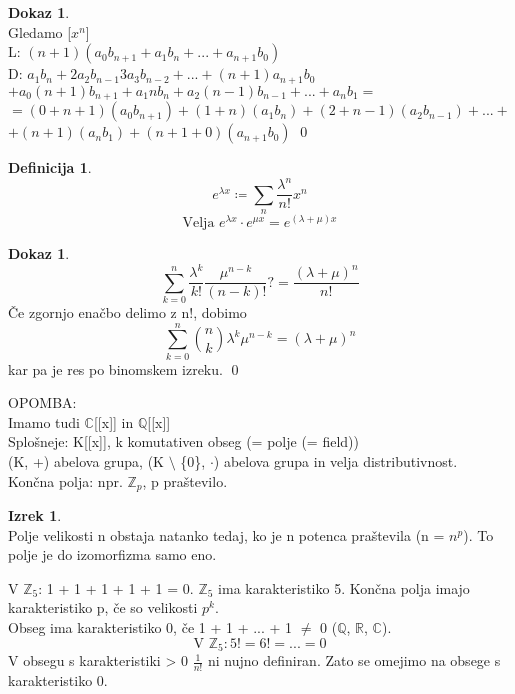 \documentclass[a4paper,12pt]{article}
\theoremstyle{definition}
\newtheorem{defn}[counter]{Definicija}
\newtheorem{theorem}[counter]{Izrek}
\newtheorem{pro}[counter]{Dokaz}
\theoremstyle{remark}
\newcommand{\Z}{\mathbb{Z}}
\newcommand{\Q}{\mathbb{Q}}
\newcommand{\R}{\mathbb{R}}
\newcommand{\C}{\mathbb{C}}
\begin{document}
\begin{pro}\mbox{}\\
    Gledamo [$x^n$]\\
    L: $(n + 1) (a_0 b_{n + 1} + a_1 b_n + ... + a_{n + 1} b_0)$\\
    D: $a_1 b_n + 2a_2 b_{n - 1} 3a_3 b_{n - 2} + ... + (n + 1) a_{n + 1} b_0$\\
    $+ a_0 (n+1) b_{n+1} + a_1 n b_{n} + a_2 (n-1) b_{n-1} + ... + a_n b_1 = $\\
    $= (0+n+1)(a_0 b_{n+1}) + (1+n)(a_1 b_n) + (2+n-1)(a_2 b_{n-1}) + ... +$ \\
    $+ (n+1)(a_n b_1) + (n+1+0)(a_{n+1} b_0)$ 
    \qed
\end{pro}

\begin{defn}
    \[e^{\lambda x} \coloneqq \sum_n \frac{\lambda^n}{n!} x^n\]
    \[\text{Velja } e^{\lambda x} \cdot e^{\mu x} = e^{(\lambda + \mu) x}\]
\end{defn}

\begin{pro}
    \[\sum_{k = 0}^{n} \frac{\lambda^k}{k!} \frac{\mu^{n - k}}{(n - k)!} ?= \frac{(\lambda + \mu)^n}{n!}\]
    Če zgornjo enačbo delimo z n!, dobimo
    \[\sum_{k = 0}^{n} \binom{n}{k} \lambda^k \mu^{n - k} = (\lambda + \mu)^{n}\]
    kar pa je res po binomskem izreku.
    \qed
\end{pro}

OPOMBA:\\
Imamo tudi $\C$[[x]] in $\Q$[[x]]\\
Splošneje: K[[x]], k komutativen obseg (= polje (= field))\\
(K, +) abelova grupa, (K $\setminus$ \{0\}, $\cdot$) abelova grupa in velja distributivnost.\\
Končna polja: npr. $\Z_p$, p praštevilo.

\begin{theorem}\mbox{}\\
    Polje velikosti n obstaja natanko tedaj, ko je n potenca praštevila (n = $n^p$). To polje je do izomorfizma samo eno.
\end{theorem}

V $\Z_5$: 1 + 1 + 1 + 1 + 1 = 0. $\Z_5$ ima karakteristiko 5. Končna polja imajo karakteristiko p, če so velikosti $p^k$.\\
Obseg ima karakteristiko 0, če 1 + 1 + ... + 1 $\neq$ 0 ($\Q$, $\R$, $\C$).\\
\[\text{V } \Z_5: 5! = 6! = ... = 0\]
V obsegu s karakteristiki > 0 $\frac{1}{n!}$ ni nujno definiran. Zato se omejimo na obsege s karakteristiko 0.
\end{document}
